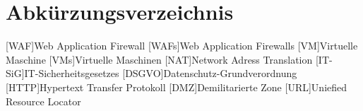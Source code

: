 \tableofcontents
\pagebreak

\section{Abkürzungsverzeichnis}

\begin{acronym}
    [WAF]{Web Application Firewall}
    [WAFs]{Web Application Firewalls}
    [VM]{Virtuelle Maschine}
    [VMs]{Virtuelle Maschinen}
    [NAT]{Network Adress Translation}
    [IT-SiG]{IT-Sicherheitsgesetzes}
    [DSGVO]{Datenschutz-Grundverordnung}
    [HTTP]{Hypertext Transfer Protokoll}
    [DMZ]{Demilitarierte Zone}
    [URL]{Uniefied Resource Locator}
\end{acronym}

\pagebreak

\listoffigures

\pagebreak